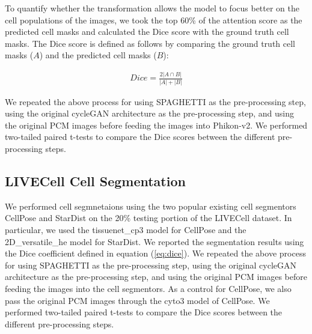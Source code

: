 \begin{refsegment}
To quantify whether the transformation allows the model to focus better on the cell populations of the images, we took the top 60\% of the attention score as the predicted cell masks and calculated the Dice score with the ground truth cell masks. The Dice score is defined as follows by comparing the ground truth cell masks ($A$) and the predicted cell masks ($B$):

\begin{equation} \label{eq:dice}
  \begin{aligned}
    Dice = \frac{2|A \cap B|}{|A| + |B|}
  \end{aligned}
\end{equation}

We repeated the above process for using SPAGHETTI as the pre-processing step, using the original cycleGAN architecture as the pre-processing step, and using the original PCM images before feeding the images into Phikon-v2. We performed two-tailed paired t-tests to compare the Dice scores between the different pre-processing steps.

\subsection*{LIVECell Cell Segmentation}
We performed cell segmnetaions using the two popular existing cell segmentors CellPose \autocite{cellpose} and StarDist \autocite{stardist} on the 20\% testing portion of the LIVECell dataset. In particular, we used the tissuenet\_cp3 model for CellPose and the 2D\_versatile\_he model for StarDist. We reported the segmentation results using the Dice coefficient defined in equation (\ref{eq:dice}). We repeated the above process for using SPAGHETTI as the pre-processing step, using the original cycleGAN architecture as the pre-processing step, and using the original PCM images before feeding the images into the cell segmentors. As a control for CellPose, we also pass the original PCM images through the cyto3 model of CellPose. We performed two-tailed paired t-tests to compare the Dice scores between the different pre-processing steps.


\end{refsegment}
